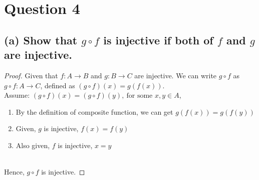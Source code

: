 \documentclass{article}
\begin{document}
%            
%

\section*{Question 4}

\subsection*{(a) Show that $g \circ f$ is injective if both of $f$ and $g$ are injective.}

\begin{proof}
    Given that $f : A \rightarrow B$ and $g : B \rightarrow C$ are injective. 
    We can write $g \circ f$ as $g \circ f: A \rightarrow C$, defined as $(g \circ f)(x) = g(f(x))$.
    \\
    Assume: $(g \circ f)(x) = (g \circ f)(y), \ \text{for some $x,y \in A$} $, 
    \begin{enumerate}
        \item By the definition of composite function, we can get $g(f(x)) = g(f(y))$
        \item Given, $g$ is injective, $f(x) = f(y)$
        \item Also given, $f$ is injective, $x = y$
    \end{enumerate}
    \\
    Hence, $g \circ f$ is injective. 
\end{proof}
\end{document}
